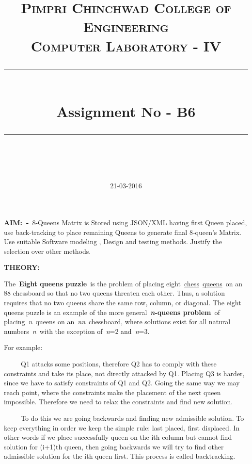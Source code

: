 \documentclass[a4paper,12pt]{article}
\title{}
\author{}
\date{21-03-2016}
\title{
	\normalfont \normalsize 
	\textsc{Pimpri Chinchwad College of Engineering \\ 
		Computer Laboratory - IV} \\
	[10pt]   
	\rule{\linewidth}{0.5pt} \\[6pt] 
	\huge Assignment No - B6 \\
	\rule{\linewidth}{2pt}  \\[10pt]
}
\author{}
\date{\normalsize}
\begin{document}
	\maketitle
\setcounter{page}{1}\pagestyle{MP}

\bigskip

{\sffamily
\textrm{\textbf{AIM:\ {}-}}\textrm{\ 8-Queens Matrix is Stored using JSON/XML having first Queen placed, use back-tracking to place
remaining Queens to generate final 8-queen's Matrix. Use suitable Software modeling , Design and
testing methods. Justify the selection over other methods.}}


\bigskip

{\sffamily
\textrm{\textbf{THEORY:}}}

{\ttfamily
\textrm{The\ }\textrm{\textbf{Eight queens puzzle}}\textrm{\ is the problem of placing
eight\ }\href{https://en.wikipedia.org/wiki/Chess}{\textrm{\textcolor[rgb]{0.0,0.0,0.5019608}{chess}}}\textrm{\ }\href{https://en.wikipedia.org/wiki/Queen_\%28chess\%29}{\textrm{\textcolor[rgb]{0.0,0.0,0.5019608}{queens}}}\textrm{\ on an 8{\texttimes}8 chessboard so that no two queens threaten each other. Thus, a solution requires that no two queens share the same row, column, or diagonal. The eight queens puzzle is an example of the more general\ }\textrm{\textbf{\textit{n}}}\textrm{\textbf{{}-queens problem}}\textrm{\ of placing\ }\textrm{\textit{n}}\textrm{\ queens on an\ }\textrm{\textit{n}}\textrm{{\texttimes}}\textrm{\textit{n}}\textrm{\ chessboard, where solutions exist for all natural numbers\ }\textrm{\textit{n}}\textrm{\ with the exception of\ }\textrm{\textit{n}}\textrm{=2 and\ }\textrm{\textit{n}}\textrm{=3.}}

{\color{black}
For example:\ }

{\color{black}
\ \ \ \ \ Q1 attacks some positions, therefore Q2 has to comply with these constraints and take its place, not directly
attacked by Q1. Placing Q3 is harder, since we have to satisfy constraints of Q1 and Q2. Going the same way we may reach
point, where the constraints make the placement of the next queen impossible. Therefore we need to relax the
constraints and find new solution.}

{\color{black}
\ \ \ \ \ To do this we are going backwards and finding new admissible solution. To keep everything in order we keep the
simple rule: last placed, first displaced. In other words if we place successfully queen on the ith column but cannot
find solution for (i+1)th queen, then going backwards we will try to find other admissible solution for the ith queen
first. This process is called backtracking.}
\end{document}
